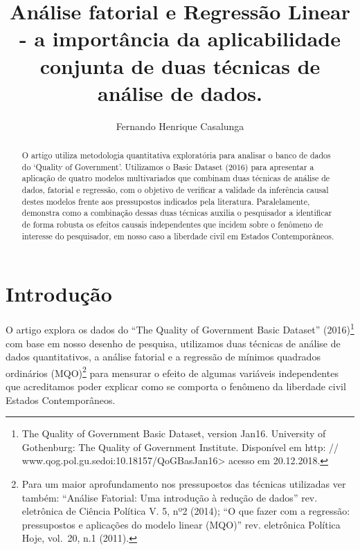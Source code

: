 \documentclass[]{elsarticle} %
\begin{document}
\begin{frontmatter}

  \title{Análise fatorial e Regressão Linear - a importância da aplicabilidade
conjunta de duas técnicas de análise de dados.}
    \author[Universidade Federal de Pernambuco]{Fernando Henrique Casalunga}
      \address[Universidade Federal de Pernambuco]{Departamento de Ciencia Politica (UFPE)}
  
  \begin{abstract}
  O artigo utiliza metodologia quantitativa exploratória para analisar o
  banco de dados do `Quality of Government'. Utilizamos o Basic Dataset
  (2016) para apresentar a aplicação de quatro modelos multivariados que
  combinam duas técnicas de análise de dados, fatorial e regressão, com o
  objetivo de verificar a validade da inferência causal destes modelos
  frente aos pressupostos indicados pela literatura. Paralelamente,
  demonstra como a combinação dessas duas técnicas auxilia o pesquisador a
  identificar de forma robusta os efeitos causais independentes que
  incidem sobre o fenômeno de interesse do pesquisador, em nosso caso a
  liberdade civil em Estados Contemporâneos.
  \end{abstract}
  
 \end{frontmatter}

\section{Introdução}\label{introducao}

O artigo explora os dados do ``The Quality of Government Basic Dataset''
(2016)\footnote{The Quality of Government Basic Dataset, version Jan16.
  University of Gothenburg: The Quality of Government Institute.
  Disponível em http: //
  www.qog.pol.gu.sedoi:10.18157/QoGBasJan16\textgreater{} acesso em
  20.12.2018.} com base em nosso desenho de pesquisa, utilizamos duas
técnicas de análise de dados quantitativos, a análise fatorial e a
regressão de mínimos quadrados ordinários (MQO)\footnote{Para um maior
  aprofundamento nos pressupostos das técnicas utilizadas ver também:
  ``Análise Fatorial: Uma introdução à redução de dados'' rev.
  eletrônica de Ciência Política V. 5, nº2 (2014); ``O que fazer com a
  regressão: pressupostos e aplicações do modelo linear (MQO)'' rev.
  eletrônica Política Hoje, vol.~20, n.1 (2011).} para mensurar o efeito
de algumas variáveis independentes que acreditamos poder explicar como
se comporta o fenômeno da liberdade civil Estados Contemporâneos.
\end{document}
